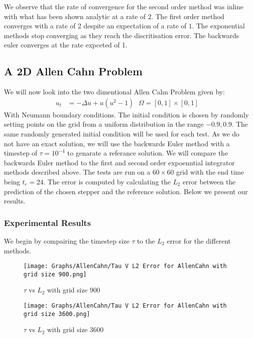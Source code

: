 We observe that the rate of convergence for the second order method was inline with what has been shown analytic\cite{Huang2022} at a rate of $2$.
The first order method converges with a rate of 2 despite an expectation of a rate of $1$\cite{Huang2022}.
The exponential methods stop converging as they reach the discritisation error.
The backwards euler converges at the rate expceted of 1.

\subsection{A 2D Allen Cahn Problem}

We will now look into the two dimentional Allen Cahn Problem given by:
\begin{align*}
    u_t &= -\Delta u + u (u^2-1) \text{ } \Omega=[0,1]\times[0,1]
\end{align*}
With Neumann boundary conditions.
The initial condition is chosen by randomly setting points on the grid from a uniform distribution in the range $-0.9,0.9$.
The same randomly generated initial condition will be used for each test.
As we do not have an exact solution, we will use the backwards Euler method with a timestep of $\tau = 10^{-4}$ to genarate a referance solution.
We will compare the backwards Euler method to the first and second order expoenntial integrator methods described above.
The tests are run on a $60\times60$ grid with the end time being $t_e=24$.
The error is computed by calculating the $L_2$ error between the prediction of the chosen stepper and the reference solution. 
Below we present our results.

\subsubsection{Experimental Results}

We begin by compairing the timestep size $\tau$ to the $L_2$ error for the different methods.

\begin{figure}[H]
    \centering
    \begin{minipage}{0.49\textwidth}
        \texttt{[image: Graphs/AllenCahn/Tau V L2 Error for AllenCahn with grid size 900.png]} %
        \caption{$\tau$ vs $L_2$ with grid size 900}
        \label{fig:ACtauE}
    \end{minipage}\hfill
    \centering
    \begin{minipage}{0.49\textwidth}
        \texttt{[image: Graphs/AllenCahn/Tau V L2 Error for AllenCahn with grid size 3600.png]} %
        \caption{$\tau$ vs $L_2$ with grid size 3600}
        \label{fig:ACtauE1024}
    \end{minipage}\hfill
\end{figure}

